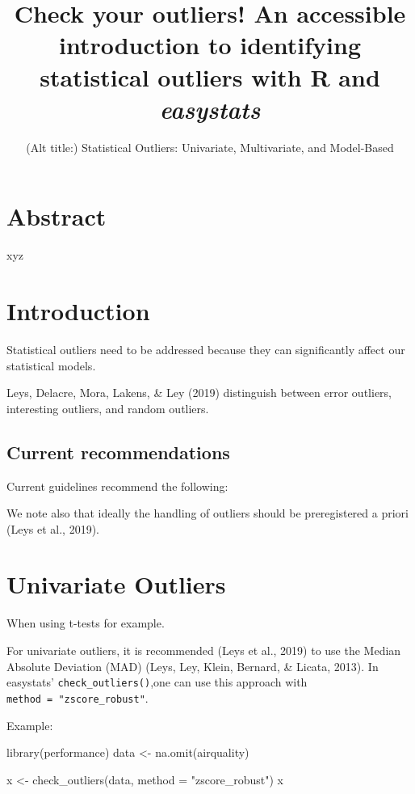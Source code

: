\documentclass[
]{article}
\title{Check your outliers! An accessible introduction to identifying
statistical outliers with R and \emph{easystats}}
\subtitle{(Alt title:) Statistical Outliers: Univariate, Multivariate,
and Model-Based}
\author{}
\date{\vspace{-2.5em}}
\newenvironment{Shaded}{\begin{snugshade}}{\end{snugshade}}
\newcommand{\AttributeTok}[1]{\textcolor[rgb]{0.77,0.63,0.00}{#1}}
\newcommand{\FunctionTok}[1]{\textcolor[rgb]{0.00,0.00,0.00}{#1}}
\newcommand{\NormalTok}[1]{#1}
\newcommand{\OtherTok}[1]{\textcolor[rgb]{0.56,0.35,0.01}{#1}}
\newcommand{\StringTok}[1]{\textcolor[rgb]{0.31,0.60,0.02}{#1}}
\begin{document}
\maketitle

\hypertarget{abstract}{%
\section{Abstract}\label{abstract}}

xyz

\hypertarget{introduction}{%
\section{Introduction}\label{introduction}}

Statistical outliers need to be addressed because they can significantly
affect our statistical models.

Leys, Delacre, Mora, Lakens, \& Ley (2019) distinguish between error
outliers, interesting outliers, and random outliers.

\hypertarget{current-recommendations}{%
\subsection{Current recommendations}\label{current-recommendations}}

Current guidelines recommend the following:

We note also that ideally the handling of outliers should be
preregistered a priori (Leys et al., 2019).

\hypertarget{univariate-outliers}{%
\section{Univariate Outliers}\label{univariate-outliers}}

When using t-tests for example.

For univariate outliers, it is recommended (Leys et al., 2019) to use
the Median Absolute Deviation (MAD) (Leys, Ley, Klein, Bernard, \&
Licata, 2013). In easystats' \texttt{check\_outliers()},one can use this
approach with \texttt{method\ =\ "zscore\_robust"}.

Example:

\begin{Shaded}
\begin{Highlighting}[]
\FunctionTok{library}\NormalTok{(performance)}
\NormalTok{data }\OtherTok{\textless{}{-}} \FunctionTok{na.omit}\NormalTok{(airquality)}

\NormalTok{x }\OtherTok{\textless{}{-}} \FunctionTok{check\_outliers}\NormalTok{(data, }\AttributeTok{method =} \StringTok{"zscore\_robust"}\NormalTok{)}
\NormalTok{x}
\end{Highlighting}
\end{Shaded}
\end{document}

